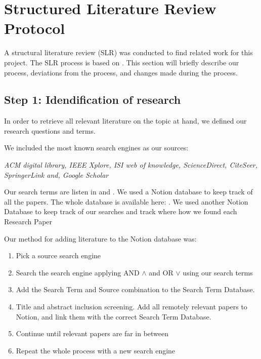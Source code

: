 
\section{Structured Literature Review Protocol}
\label{section:BT:SLR}

A structural literature review (SLR) was conducted to find related work for this project.
The SLR process is based on \cite{AndersKofod-Petersen2018}.
This section will briefly describe our process, deviations from the process,
and changes made during the process.

\subsection{Step 1: Idendification of research}
In order to retrieve all relevant literature on the topic at hand, we defined our
research questions and terms.

We included the most known search engines as our sources:

\textit{
    ACM digital library,
    IEEE Xplore,
    ISI web of knowledge,
    ScienceDirect,
    CiteSeer,
    SpringerLink and,
    Google Scholar
}

Our search terms are listen in  and .
We used a Notion database to keep track of all the papers. The whole database is available here: \cite{slrdatabase}.
We used another Notion Database to keep track of our searches and track where how we found each Research Paper
\cite{searchtermtable}

Our method for adding literature to the Notion database was:
\begin{enumerate}
    \item Pick a source search engine
    \item Search the search engine applying AND $\wedge$ and OR $\vee$ using our search terms
    \item Add the Search Term and Source combination to the Search Term Database.
    \item Title and abstract inclusion screening. Add all remotely relevant papers to Notion, and link them with the correct Search Term Database.
    \item Continue until relevant papers are far in between
    \item Repeat the whole process with a new search engine
\end{enumerate}

